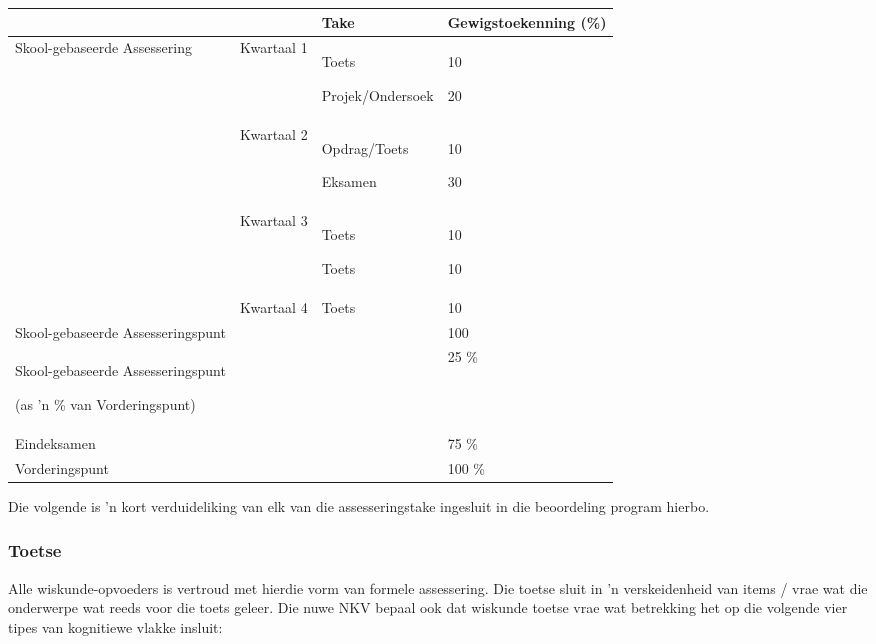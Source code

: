 \begin{table}[H]
\begin{center}
\begin{tabular} {|p{4.5cm}|p{1.5cm}|p{3cm}|p{2cm}|} \hline
	  & 			& \textbf{Take} 			& \textbf{Gewigstoekenning (\%)} \\ \hline
Skool-gebaseerde Assessering &
Kwartaal 1 &
Toets \par Projek/Ondersoek &
10 \par 20 \\ \hline
&
Kwartaal 2 &
Opdrag/Toets \par Eksamen &
10 \par 30 \\ \hline
&
Kwartaal 3 &
Toets \par Toets &
10 \par 10 \\ \hline
&
Kwartaal 4 & Toets &
10 \\ \hline
Skool-gebaseerde Assesseringspunt &
&
&
100 \\ \hline
Skool-gebaseerde Assesseringspunt  \par
(as 'n \% van Vorderingspunt)
			&	 & 					&  25 \% \\ \hline

Eindeksamen & 	& 					&75 \% \\ \hline
Vorderingspunt 		&       & 					& 100 \% \\ \hline


\end{tabular}
 \end{center}
\end{table}

Die volgende is 'n kort verduideliking van elk van die assesseringstake ingesluit in die beoordeling program hierbo.

\subsubsection{Toetse}
Alle wiskunde-opvoeders is vertroud met hierdie vorm van formele assessering. Die toetse sluit in 'n verskeidenheid van items / vrae wat die onderwerpe wat reeds voor die toets geleer. Die nuwe NKV bepaal ook dat wiskunde toetse vrae wat betrekking het op die volgende vier tipes van kognitiewe vlakke insluit:

